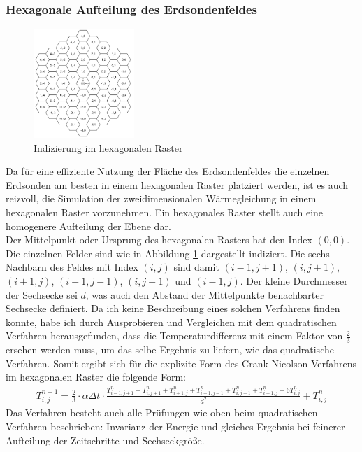 \documentclass[12pt,a4paper]{article}
\begin{document}
\subsubsection{Hexagonale Aufteilung des Erdsondenfeldes}
\begin{figure}
  \centering
  \includegraphics[width=0.34\textwidth]{HexagonIndices.png}
  \caption{Indizierung im \mbox{hexagonalen} Raster}
  \label{fig:hexindex}
\end{figure}
Da für eine effiziente Nutzung der Fläche des Erdsondenfeldes die einzelnen Erdsonden am besten in einem hexagonalen Raster platziert werden, ist es auch reizvoll, die Simulation der zweidimensionalen Wärmegleichung in einem hexagonalen Raster vorzunehmen. Ein hexagonales Raster stellt auch eine homogenere Aufteilung der Ebene dar.\\
Der Mittelpunkt oder Ursprung des hexagonalen Rasters hat den Index $(0,0)$. Die einzelnen Felder sind wie in Abbildung \ref{fig:hexindex} dargestellt indiziert. Die sechs Nachbarn des Feldes mit Index $(i,j)$ sind damit $(i-1,j+1)$, $(i,j+1)$, $(i+1,j)$, $(i+1,j-1)$, $(i,j-1)$ und $(i-1,j)$. Der kleine Durchmesser der Sechsecke sei $d$, was auch den Abstand der Mittelpunkte benachbarter Sechsecke definiert. Da ich keine Beschreibung eines solchen Verfahrens finden konnte, habe ich durch Ausprobieren und Vergleichen mit dem quadratischen Verfahren herausgefunden, dass die Temperaturdifferenz mit einem Faktor von $\frac{2}{3}$ ersehen werden muss, um das selbe Ergebnis zu liefern, wie das quadratische Verfahren. Somit ergibt sich für die explizite Form des Crank-Nicolson Verfahrens im hexagonalen Raster die folgende Form:
\begin{align}
T_{i,j}^{n+1}  = \frac{2}{3} \cdot \alpha \Delta t \cdot
\frac{T_{i-1,j+1}^n + T_{i,j+1}^n+ T_{i+1,j}^n+ T_{i+1,j-1}^n+ T_{i,j-1}^n+ T_{i-1,j}^n - 6T_{i,j}^n }{d^2}  + T_{i,j}^n
\end{align} 
Das Verfahren besteht auch alle Prüfungen wie oben beim quadratischen Verfahren beschrieben: Invarianz der Energie und gleiches Ergebnis bei feinerer Aufteilung der Zeitschritte und Sechseckgröße.
\end{document}
